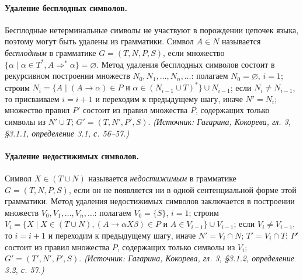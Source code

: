 \documentclass[a4paper,12pt]{article}
\begin{document}
\paragraph{Удаление бесплодных символов.}
Бесплодные нетерминальные символы не участвуют в порождении цепочек языка, поэтому могут быть удалены из грамматики. Символ \(A\in N\) называется \emph{бесплодным} в грамматике \(G=(T,N,P,S)\), если множество \(\{\alpha\mid\alpha\in T^*, A\Rightarrow^*\alpha\}=\varnothing\). Метод удаления бесплодных символов состоит в рекурсивном построении множеств \(N_0,N_1,\ldots,N_n,\ldots\): полагаем \(N_0=\varnothing\), \(i=1\); строим \(N_i=\{A\mid(A\to\alpha)\in P\text{ и }\alpha\in(N_{i-1}\cup T)^*\}\cup N_{i-1}\); если \(N_i\ne N_{i-1}\), то присваиваем \(i=i+1\) и переходим к предыдущему шагу, иначе \(N'=N_i\); множество правил \(P'\) состоит из правил множества \(P\), содержащих только символы из \(N'\cup T\); \(G'=(T,N',P',S)\).
\textit{(Источник: Гагарина, Кокорева, гл. 3, §3.1.1, определение 3.1, с. 56--57.)}

\paragraph{Удаление недостижимых символов.}
Символ \(X\in(T\cup N)\) называется \emph{недостижимым} в грамматике \(G=(T,N,P,S)\), если он не появляется ни в одной сентенциальной форме этой грамматики. Метод удаления недостижимых символов заключается в построении множеств \(V_0,V_1,\ldots,V_n,\ldots\): полагаем \(V_0=\{S\}\), \(i=1\); строим \(V_i=\{X\mid X\in(T\cup N), (A\to\alpha X\beta)\in P\text{ и }A\in V_{i-1}\}\cup V_{i-1}\); если \(V_i\ne V_{i-1}\), то \(i=i+1\) и переходим к предыдущему шагу, иначе \(N'=V_i\cap N\); \(T'=V_i\cap T\); \(P'\) состоит из правил множества \(P\), содержащих только символы из \(V_i\); \(G'=(T',N',P',S)\).
\textit{(Источник: Гагарина, Кокорева, гл. 3, §3.1.2, определение 3.2, с. 57.)}
\end{document}
